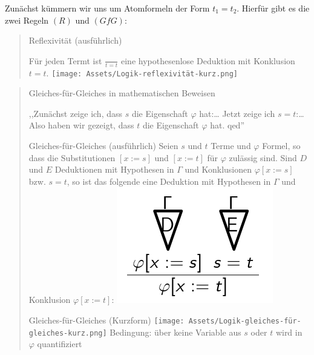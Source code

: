\documentclass[a4paper]{article}
\begin{document}
\begin{multicols}{3}
  Zunächst kümmern wir uns um Atomformeln der Form $t_1 =t_2$. Hierfür
  gibt es die zwei Regeln $(R)$ und $(GfG)$:

  \begin{quote}
    Reflexivität (ausführlich)

    Für jeden Termt ist $\frac{}{t=t}$ eine hypothesenlose Deduktion mit
    Konklusion $t=t$. \texttt{[image: Assets/Logik-reflexivität-kurz.png]}
  \end{quote}

  \begin{quote}
    Gleiches-für-Gleiches in mathematischen Beweisen

    ,,Zunächst zeige ich, dass $s$ die Eigenschaft $\varphi$ hat:\ldots{}
    Jetzt zeige ich $s=t$:\ldots{} Also haben wir gezeigt, dass $t$ die
    Eigenschaft $\varphi$ hat. qed''

    Gleiches-für-Gleiches (ausführlich) Seien $s$ und $t$ Terme und
    $\varphi$ Formel, so dass die Substitutionen $[x:=s]$ und $[x:=t]$ für
    $\varphi$ zulässig sind. Sind $D$ und $E$ Deduktionen mit Hypothesen in
    $\Gamma$ und Konklusionen $\varphi[x:=s]$ bzw. $s=t$, so ist das
    folgende eine Deduktion mit Hypothesen in $\Gamma$ und Konklusion
    $\varphi[x:=t]$:
    \includegraphics[width=\linewidth]{Assets/Logik-gleiches-für-gleiches-ausführlich.png}

    Gleiches-für-Gleiches (Kurzform)
    \texttt{[image: Assets/Logik-gleiches-für-gleiches-kurz.png]} Bedingung:
    über keine Variable aus $s$ oder $t$ wird in $\varphi$ quantifiziert
  \end{quote}


\end{multicols}
\end{document}
